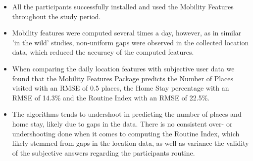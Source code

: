 \begin{itemize}
    \item All the participants successfully installed and used the Mobility Features throughout the study period.
    
    \item Mobility features were computed several times a day, however, as in similar 'in the wild' studies, non-uniform gaps were observed in the collected location data, which reduced the accuracy of the computed features.
    
    \item When comparing the daily location features with subjective user data we found that the Mobility Features Package predicts the Number of Places visited with an RMSE of 0.5 places, the Home Stay percentage with an RMSE of 14.3\% and the Routine Index with an RMSE of 22.5\%.
    
    \item The algorithms tends to undershoot in predicting the number of places and home stay, likely due to gaps in the data. There is no consistent over- or undershooting done when it comes to computing the Routine Index, which likely stemmed from gaps in the location data, as well as variance the validity of the subjective answers regarding the participants routine.
\end{itemize}
